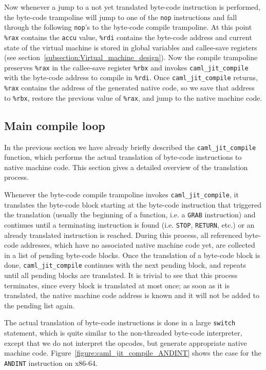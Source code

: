 \documentclass[10pt,a4paper,twocolumn]{article}
\begin{document}
Now whenever a jump to a not yet translated byte-code instruction is performed, the byte-code trampoline
will jump to one of the \texttt{nop} instructions and fall through the following \texttt{nop}'s to the
byte-code compile trampoline. At this point \texttt{\%rax} contains the \texttt{accu} value, \texttt{\%rdi}
contains the byte-code address and current state of the virtual machine is stored in global variables
and callee-save registers (see section~\ref{subsection:Virtual_machine_design}).
Now the compile trampoline preserves \texttt{\%rax} in the
callee-save register \texttt{\%rbx} and invokes \texttt{caml\_jit\_compile} with the byte-code address to
compile in \texttt{\%rdi}. Once \texttt{caml\_jit\_compile} returns, \texttt{\%rax} contains the
address of the generated native code, so we save that address to \texttt{\%rbx}, restore the previous
value of \texttt{\%rax}, and jump to the native machine code.

\subsection{Main compile loop}

In the previous section we have already briefly described the \texttt{caml\_jit\_compile} function,
which performs the actual translation of byte-code instructions to native machine code. This section
gives a detailed overview of the translation process.

Whenever the byte-code compile trampoline invokes \texttt{caml\_jit\_compile}, it translates the byte-code
block starting at the byte-code instruction that triggered the translation (usually the beginning of a function,
i.e. a \texttt{GRAB} instruction)
and continues until a terminating instruction is found (i.e. \texttt{STOP}, \texttt{RETURN}, etc.) or an already
translated instruction is reached. During this process, all referenced byte-code addresses, which have no associated 
native machine code yet, are collected in a list of pending byte-code blocks. Once the translation of a byte-code
block is done, \texttt{caml\_jit\_compile} continues with the next pending block, and repeats until
all pending blocks are translated. It is trivial to see that this process terminates, since 
every block is translated at most once; as soon as it is translated, the native machine code address
is known and it will not be added to the pending list again.

The actual translation of byte-code instructions is done in a large \texttt{switch} statement, which is
quite similar to the non-threaded byte-code interpreter, except that we do not interpret the opcodes,
but generate appropriate native machine code. Figure~\ref{figure:caml_jit_compile_ANDINT} shows the 
case for the \texttt{ANDINT} instruction on x86-64.
\end{document}
